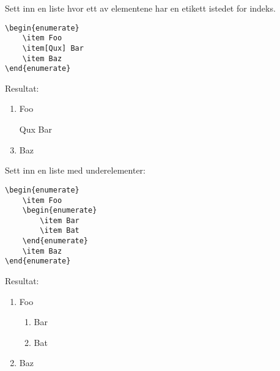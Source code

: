Sett inn en liste hvor ett av elementene har en etikett istedet for indeks.
\vspace{0.75em}
\begin{lstlisting}[language=Tex]
\begin{enumerate}
    \item Foo
    \item[Qux] Bar
    \item Baz
\end{enumerate}
\end{lstlisting}
\noindent Resultat:
\begin{enumerate}
    \item Foo
    \item[Qux] Bar
    \item Baz
\end{enumerate}
\vspace{0.75em}


\horizontalrule


\noindent Sett inn en liste med underelementer:
\vspace{0.75em}
\begin{lstlisting}[language=Tex]
\begin{enumerate}
    \item Foo
    \begin{enumerate}
        \item Bar
        \item Bat
    \end{enumerate}
    \item Baz
\end{enumerate}
\end{lstlisting}
\vspace{0.75em}

\noindent Resultat:
\begin{enumerate}
    \item Foo
    \begin{enumerate}
        \item Bar
        \item Bat
    \end{enumerate}
    \item Baz
\end{enumerate}
